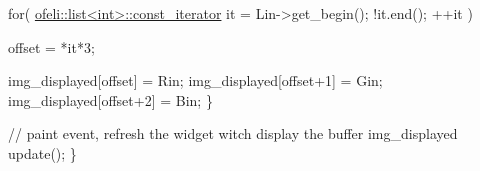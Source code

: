 \begin{DoxyCode}
    \textcolor{keywordflow}{for}( \hyperlink{classofeli_1_1list_1_1const__iterator}{ofeli::list<int>::const\_iterator} it = Lin->get\_begin(); !it.end();
       ++it )

        offset = *it*3;

        img\_displayed[offset] = Rin;
        img\_displayed[offset+1] = Gin;
        img\_displayed[offset+2] = Bin;
    \}

    \textcolor{comment}{// paint event, refresh the widget witch display the buffer img\_displayed}
    update();
\}
\end{DoxyCode}



\begin{DoxyCodeInclude}
\end{DoxyCodeInclude}
 